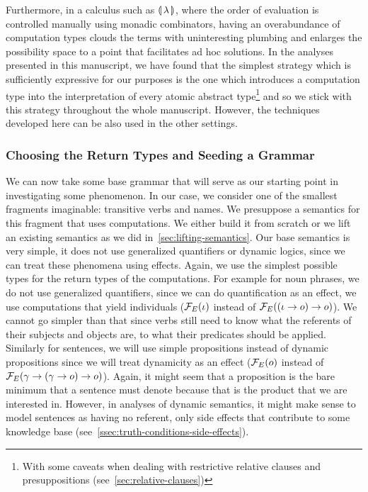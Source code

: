 Furthermore, in a calculus such as $\llparenthesis \, \lambda \, \rrparenthesis$, where the order of
evaluation is controlled manually using monadic combinators, having an
overabundance of computation types clouds the terms with uninteresting
plumbing and enlarges the possibility space to a point that facilitates ad
hoc solutions. In the analyses presented in this manuscript, we have found
that the simplest strategy which is sufficiently expressive for our
purposes is the one which introduces a computation type into the
interpretation of every atomic abstract type\footnote{With some caveats
  when dealing with restrictive relative clauses and presuppositions
  (see~\ref{sec:relative-clauses})} and so we stick with this strategy
throughout the whole manuscript. However, the techniques developed here can
be also used in the other settings.


\subsubsection{Choosing the Return Types and Seeding a Grammar}

We can now take some base grammar that will serve as our starting point in
investigating some phenomenon. In our case, we consider one of the smallest
fragments imaginable: transitive verbs and names. We presuppose a semantics
for this fragment that uses computations. We either build it from scratch
or we lift an existing semantics as we did
in~\ref{sec:lifting-semantics}. Our base semantics is very simple, it does
not use generalized quantifiers or dynamic logics, since we can treat these
phenomena using effects. Again, we use the simplest possible types for the
return types of the computations. For example for noun phrases, we do not
use generalized quantifiers, since we can do quantification as an effect,
we use computations that yield individuals ($\mathcal{F}_E(\iota)$ instead of
$\mathcal{F}_E((\iota \to o) \to o)$). We cannot go simpler than that since verbs
still need to know what the referents of their subjects and objects are, to
what their predicates should be applied. Similarly for sentences, we will
use simple propositions instead of dynamic propositions since we will treat
dynamicity as an effect ($\mathcal{F}_E(o)$ instead of
$\mathcal{F}_E(\gamma \to (\gamma \to o) \to o)$). Again, it might seem that a
proposition is the bare minimum that a sentence must denote because that is
the product that we are interested in. However, in analyses of dynamic
semantics, it might make sense to model sentences as having no referent,
only side effects that contribute to some knowledge base
(see~\ref{ssec:truth-conditions-side-effects}).


